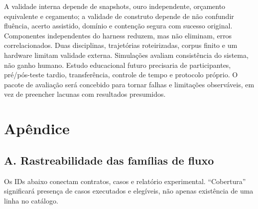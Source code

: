 \documentclass[12pt]{article}
\begin{document}
A validade interna depende de snapshots, ouro independente, orçamento equivalente e cegamento; a validade de construto depende de não confundir fluência, acerto assistido, domínio e contenção segura com sucesso original. Componentes independentes do harness reduzem, mas não eliminam, erros correlacionados. Duas disciplinas, trajetórias roteirizadas, corpus finito e um hardware limitam validade externa. Simulações avaliam consistência do sistema, não ganho humano. Estudo educacional futuro precisaria de participantes, pré/pós-teste tardio, transferência, controle de tempo e protocolo próprio. O pacote de avaliação será concebido para tornar falhas e limitações observáveis, em vez de preencher lacunas com resultados presumidos.

\section*{Apêndice}
\label{sec:apendice}

\subsection*{A. Rastreabilidade das famílias de fluxo}

Os IDs abaixo conectam contratos, casos e relatório experimental. ``Cobertura'' significará presença de casos executados e elegíveis, não apenas existência de uma linha no catálogo.
\end{document}
